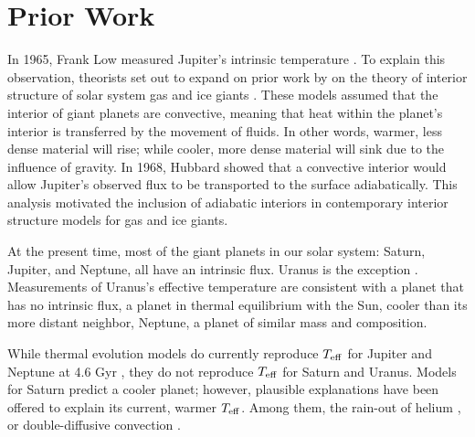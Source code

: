 \documentclass[11pt]{ucscthesisbs}
\begin{document}
\section{Prior Work}
In 1965, Frank Low measured Jupiter's intrinsic temperature \citep{low_1966}. To explain this observation, theorists set out to expand on prior work by \citep{demarcus_1958} on the theory of interior structure of solar system gas and ice giants \citep{hubbard_1968, smoluchowski_1967,hubbard_1977, hubbard_1977_2, podolak_1991}. These models assumed that the interior of giant planets are convective, meaning that heat within the planet's interior is transferred by the movement of fluids. In other words, warmer, less dense material will rise; while cooler, more dense material will sink due to the influence of gravity. In 1968, Hubbard showed that a convective interior would allow Jupiter's observed flux to be transported to the surface adiabatically. This analysis motivated the inclusion of adiabatic interiors in contemporary interior structure models for gas and ice giants.

At the present time, most of the giant planets in our solar system: Saturn, Jupiter, and Neptune, all have an intrinsic flux. Uranus is the exception \citep{pearl_conrath_1991}. Measurements of Uranus's effective temperature are consistent with a planet that has no intrinsic flux, a planet in thermal equilibrium with the Sun, cooler than its more distant neighbor, Neptune, a planet of similar mass and composition. 

While thermal evolution models do currently reproduce $T_{\rm eff}$ for Jupiter and Neptune at 4.6 Gyr \citep{graboske_1975,fortney_2011}, they do not reproduce $T_{\rm eff}$ for Saturn and Uranus. Models for Saturn predict a cooler planet; however, plausible explanations have been offered to explain its current, warmer $T_{\rm eff}$. Among them, the rain-out of helium \citep{fortney_hubbard_2003, mankovich_2020}, or double-diffusive convection \citep{leconte_chabrier_2013}. 
\end{document}
